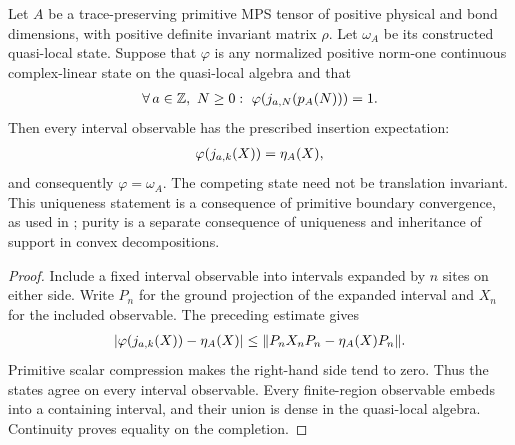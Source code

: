 \begin{lemma}
    \label{thm:primitive_supported_quasi_local_state_unique}
    \leanok
    Let $A$ be a trace-preserving primitive MPS tensor of positive physical
    and bond dimensions, with positive definite invariant matrix $\rho$. Let $\omega_A$ be its constructed quasi-local state.
    Suppose that $\varphi$ is any normalized positive norm-one continuous
    complex-linear state on the quasi-local algebra and that
    \begin{align}
        \forall\,a\in\mathbb Z,\ N\geq0:\ \varphi(j_{a,N}(p_A(N)))=1.
        \notag
    \end{align}
    Then every interval observable has the prescribed insertion expectation:
    \begin{align}
        \varphi(j_{a,k}(X))=\eta_A(X),
        \notag
    \end{align}
    and consequently $\varphi=\omega_A$. The competing state need not be
    translation invariant. This uniqueness statement is a consequence of
    primitive boundary convergence, as used in
    \cite[Sections~3 and~6]{Nachtergaele1996Spectral}; purity is a separate
    consequence of uniqueness and inheritance of support in convex
    decompositions.
\end{lemma}
\begin{proof}\leanok
    Include a fixed interval observable into intervals expanded by $n$ sites
    on either side. Write $P_n$ for the ground projection of the expanded
    interval and $X_n$ for the included observable. The preceding estimate
    gives
    \begin{align}
        |\varphi(j_{a,k}(X))-\eta_A(X)|
        \leq\|P_nX_nP_n-\eta_A(X)P_n\|.
        \notag
    \end{align}
    Primitive scalar compression makes the right-hand side tend to zero.
    Thus the states agree on every interval observable. Every finite-region
    observable embeds into a containing interval, and their union is dense
    in the quasi-local algebra. Continuity proves equality on the completion.
\end{proof}

